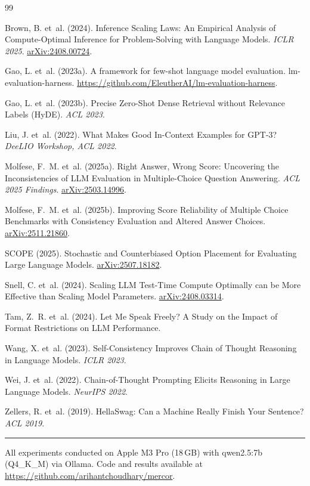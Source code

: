 \documentclass[11pt]{article}
\begin{document}


\begin{thebibliography}{99}

Brown, B. et~al. (2024).
\newblock Inference Scaling Laws: An Empirical Analysis of Compute-Optimal Inference for Problem-Solving with Language Models.
\newblock \emph{ICLR 2025}. \href{https://arxiv.org/abs/2408.00724}{arXiv:2408.00724}.

Gao, L. et~al. (2023a).
\newblock A framework for few-shot language model evaluation.
\newblock lm-evaluation-harness. \url{https://github.com/EleutherAI/lm-evaluation-harness}.

Gao, L. et~al. (2023b).
\newblock Precise Zero-Shot Dense Retrieval without Relevance Labels (HyDE).
\newblock \emph{ACL 2023}.

Liu, J. et~al. (2022).
\newblock What Makes Good In-Context Examples for GPT-3?
\newblock \emph{DeeLIO Workshop, ACL 2022}.

Molfese, F.~M. et~al. (2025a).
\newblock Right Answer, Wrong Score: Uncovering the Inconsistencies of LLM Evaluation in Multiple-Choice Question Answering.
\newblock \emph{ACL 2025 Findings}. \href{https://arxiv.org/abs/2503.14996}{arXiv:2503.14996}.

Molfese, F.~M. et~al. (2025b).
\newblock Improving Score Reliability of Multiple Choice Benchmarks with Consistency Evaluation and Altered Answer Choices.
\newblock \href{https://arxiv.org/abs/2511.21860}{arXiv:2511.21860}.

SCOPE (2025).
\newblock Stochastic and Counterbiased Option Placement for Evaluating Large Language Models.
\newblock \href{https://arxiv.org/abs/2507.18182}{arXiv:2507.18182}.

Snell, C. et~al. (2024).
\newblock Scaling LLM Test-Time Compute Optimally can be More Effective than Scaling Model Parameters.
\newblock \href{https://arxiv.org/abs/2408.03314}{arXiv:2408.03314}.

Tam, Z.~R. et~al. (2024).
\newblock Let Me Speak Freely? A Study on the Impact of Format Restrictions on LLM Performance.

Wang, X. et~al. (2023).
\newblock Self-Consistency Improves Chain of Thought Reasoning in Language Models.
\newblock \emph{ICLR 2023}.

Wei, J. et~al. (2022).
\newblock Chain-of-Thought Prompting Elicits Reasoning in Large Language Models.
\newblock \emph{NeurIPS 2022}.

Zellers, R. et~al. (2019).
\newblock HellaSwag: Can a Machine Really Finish Your Sentence?
\newblock \emph{ACL 2019}.

\end{thebibliography}

\vspace{1em}
\noindent\rule{\textwidth}{0.4pt}
\footnotesize{All experiments conducted on Apple M3 Pro (18\,GB) with qwen2.5:7b (Q4\_K\_M) via Ollama. Code and results available at \url{https://github.com/arihantchoudhary/mercor}.}
\end{document}
